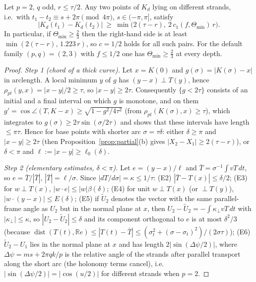 \begin{lemma}[antipodal strands, $p=2$]\label{lem:Hc1}
Let $p=2$, $q$ odd, $r\le\tau/2$. Any two points of $K_d$ lying on different strands, i.e.\ with
$t_1-t_2\equiv s+2\pi\pmod{4\pi}$, $s\in(-\pi,\pi]$, satisfy
\[
|K_d(t_1)-K_d(t_2)|\ \ge\ \min\bigl(2(\tau-r),\ 2\,c_1(f,\Theta_{\min})\,r\bigr).
\]
In particular, if $\Theta_{\min}\ge\tfrac23$ then the right-hand side is at least $\min(2(\tau-r),\,1.223\,r)$, so
$c=1/2$ holds for all such pairs. For the default family $(p,q)=(2,3)$ with $f\le1/2$ one has
$\Theta_{\min}\ge\tfrac23$ at every depth.
\end{lemma}
\begin{proof}
\emph{Step 1 (chord of a thick curve).} Let $x=K(0)$ and $g(\sigma)=|K(\sigma)-x|$ in arclength. A local minimum
$y$ of $g$ has $(y-x)\perp T(y)$, hence $\rho_{pt}(y,x)=|x-y|/2\ge\tau$, so $|x-y|\ge2\tau$. Consequently
$\{g<2\tau\}$ consists of an initial and a final interval on which $g$ is monotone, and on them
$g'=\cos\angle(T,K-x)\ge\sqrt{1-g^2/4\tau^2}$ (from $\rho_{pt}(K(\sigma),x)\ge\tau$), which integrates to
$g(\sigma)\ge2\tau\sin(\sigma/2\tau)$ and shows that these intervals have length $\le\pi\tau$. Hence for base points
with shorter arc $\sigma=\tau\delta$: either $\delta\ge\pi$ and $|x-y|\ge2\tau$ (then Proposition~\ref{prop:partial}(b)
gives $|X_2-X_1|\ge2(\tau-r)$), or $\delta<\pi$ and $\ell:=|x-y|\ge\ell_0(\delta)$.

\emph{Step 2 (elementary estimates, $\delta<\pi$).} Let $e=(y-x)/\ell$ and $\bar T=\sigma^{-1}\int vT\,dt$, so
$e=\bar T/|\bar T|$, $|\bar T|=\ell/\sigma$. Since $|dT/d\sigma|=\kappa\le1/\tau$: (E2) $|\bar T-T(x)|\le\delta/2$;
(E3) for $w\perp T(x)$, $|w\cdot e|\le|w|\beta(\delta)$; (E4) for unit $w\perp T(x)$ (or $\perp T(y)$),
$|w\cdot(y-x)|\le E(\delta)$; (E5) if $\tilde U_2$ denotes the vector with the same parallel-frame angle as $U_2$ but
in the normal plane at $x$, then $U_2-\tilde U_2=-\int\kappa_\perp vT\,dt$ with $|\kappa_\perp|\le\kappa$, so
$|U_2-\tilde U_2|\le\delta$ and its component orthogonal to $e$ is at most $\delta^2/3$ (because
$\operatorname{dist}(T(t),\mathbb Re)\le|T(t)-\bar T|\le(\sigma_t^2+(\sigma-\sigma_t)^2)/(2\sigma\tau)$);
(E6) $\tilde U_2-U_1$ lies in the normal plane at $x$ and has length $2|\sin(\Delta\psi/2)|$, where
$\Delta\psi=ms+2\pi qk/p$ is the relative angle of the strands after parallel transport along the short arc
(the holonomy terms cancel), i.e.\ $|\sin(\Delta\psi/2)|=|\cos(u/2)|$ for different strands when $p=2$.


\end{proof}
